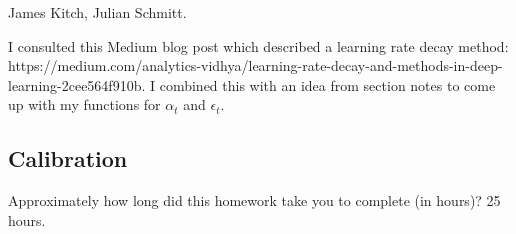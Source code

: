\documentclass[submit]{harvardml}
\begin{document}
James Kitch, Julian Schmitt.

I consulted this Medium blog post which described a learning rate decay method: https://medium.com/analytics-vidhya/learning-rate-decay-and-methods-in-deep-learning-2cee564f910b. I combined this with an idea from section notes to come up with my functions for $\alpha_t$ and $\epsilon_t$.

\subsection*{Calibration}
Approximately how long did this homework take you to complete (in hours)? 
25 hours.
\end{document}
